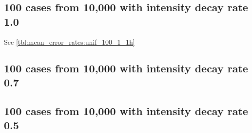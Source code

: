 \subsection{100 cases from 10,000 with intensity decay rate 1.0}

See \autoref{tbl:mean_error_rates:unif_100_1_1h}
\begin{table}[H]
\centering
\scriptsize

    \begin{subtable}{0.5\textwidth}
    
    \caption[]{Means} 
    \end{subtable}%
    \begin{subtable}{0.5\textwidth}
    
    \caption[]{Standard deviations} 
    \end{subtable}

\caption[]{Error rates for uniform population of 10,000, single peak intensity of factor 100 and decay rate 1.0}
\label{tbl:mean_error_rates:unif_100_1_1h:3}
\end{table}

\subsection{100 cases from 10,000 with intensity decay rate 0.7}
\begin{table}[H]
\centering
\scriptsize

    \begin{subtable}{0.5\textwidth}
    
    \caption[]{Means} 
    \end{subtable}%
    \begin{subtable}{0.5\textwidth}
    
    \caption[]{Standard deviations} 
    \end{subtable}

\caption[]{Error rates for uniform population of 10,000, single peak intensity of factor 100 and decay rate 0.7}
\label{tbl:mean_error_rates:unif_100_0.7_1h}
\end{table}

\subsection{100 cases from 10,000 with intensity decay rate 0.5}
\begin{table}[H]
\centering
\scriptsize

    \begin{subtable}{0.5\textwidth}
    
    \caption[]{Means} 
    \end{subtable}%
    \begin{subtable}{0.5\textwidth}
    
    \caption[]{Standard deviations} 
    \end{subtable}

\caption[]{Error rates for uniform population of 10,000, single peak intensity of factor 100 and decay rate 0.5}
\label{tbl:mean_error_rates:unif_100_0.5_1h}
\end{table}


